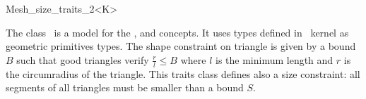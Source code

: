 \begin{ccRefClass}{Mesh_size_traits_2<K>}

\ccDefinition
  
The class \ccRefName\ is a model for the ,
 and 
concepts. It uses types defined in \cgal\ kernel as geometric
primitives types. The shape constraint on triangle is given by a bound
$B$ such that good triangles verify $\frac{r}{l} \le B$ where $l$ is
the minimum length and $r$ is the circumradius of the triangle. This
traits class defines also a size constraint: all segments of all
triangles must be smaller than a bound $S$.


\ccIsModel

 \\
 \\

\ccCreation
{}

\end{ccRefClass}
